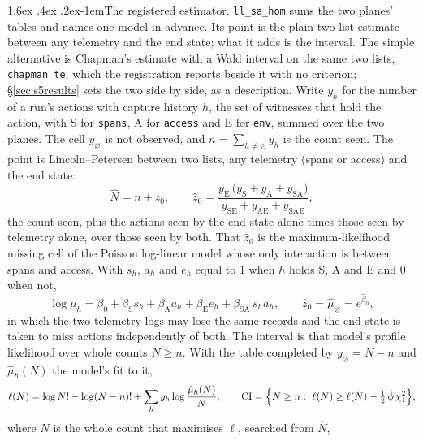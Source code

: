 \documentclass[11pt]{article}
\makeatletter
\renewcommand\paragraph{\@startsection{paragraph}{4}{\z@}%
  {1.6ex \@plus .4ex \@minus .2ex}{-1em}{\normalfont\normalsize\bfseries}}
\makeatother
\begin{document}
\paragraph{The registered estimator.} \texttt{ll\_sa\_hom} sums the two planes' tables
and names one model in advance. Its point is the plain two-list estimate between any
telemetry and the end state; what it adds is the interval. The simple alternative is
Chapman's estimate with a Wald interval on the same two lists, \texttt{chapman\_te},
which the registration reports beside it with no criterion; \S\ref{sec:s5results} sets
the two side by side, as a description. Write $y_h$ for the number of a run's actions with
capture history $h$, the set of witnesses that hold the action, with S for
\texttt{spans}, A for \texttt{access} and E for \texttt{env}, summed over the two planes.
The cell $y_\varnothing$ is not observed, and $n=\sum_{h\neq\varnothing}y_h$ is the count
seen. The point is Lincoln--Petersen between two lists, any telemetry (spans or access)
and the end state:
\begin{equation}
\hat N = n+\hat z_0,\qquad
\hat z_0=\frac{y_{\mathrm{E}}\,\bigl(y_{\mathrm{S}}+y_{\mathrm{A}}+y_{\mathrm{SA}}\bigr)}
{y_{\mathrm{SE}}+y_{\mathrm{AE}}+y_{\mathrm{SAE}}},
\label{eq:point}
\end{equation}
the count seen, plus the actions seen by the end state alone times those seen by
telemetry alone, over those seen by both. That $\hat z_0$ is the maximum-likelihood
missing cell of the Poisson log-linear model whose only interaction is between spans and
access. With $s_h$, $a_h$ and $e_h$ equal to 1 when $h$ holds S, A and E and 0 when not,
\begin{equation}
\log\mu_h=\beta_0+\beta_{\mathrm{S}}s_h+\beta_{\mathrm{A}}a_h+\beta_{\mathrm{E}}e_h
+\beta_{\mathrm{SA}}\,s_h a_h,\qquad
\hat z_0=\hat\mu_\varnothing=e^{\hat\beta_0},
\label{eq:model}
\end{equation}
in which the two telemetry logs may lose the same records and the end state is taken to
miss actions independently of both. The interval is that model's profile likelihood over
whole counts $N\ge n$. With the table completed by $y_\varnothing=N-n$ and
$\hat\mu_h(N)$ the model's fit to it,
\begin{equation}
\ell(N)=\log N!-\log(N-n)!+\sum_{h}y_h\log\frac{\hat\mu_h(N)}{N},
\qquad
\mathrm{CI}=\Bigl\{N\ge n:\ \ell(N)\ge\ell(\tilde N)-\tfrac12\,\hat\phi\,\chi^2_{1}\Bigr\},
\label{eq:profile}
\end{equation}
where $\tilde N$ is the whole count that maximises $\ell$, searched from $\hat N$,
\end{document}
